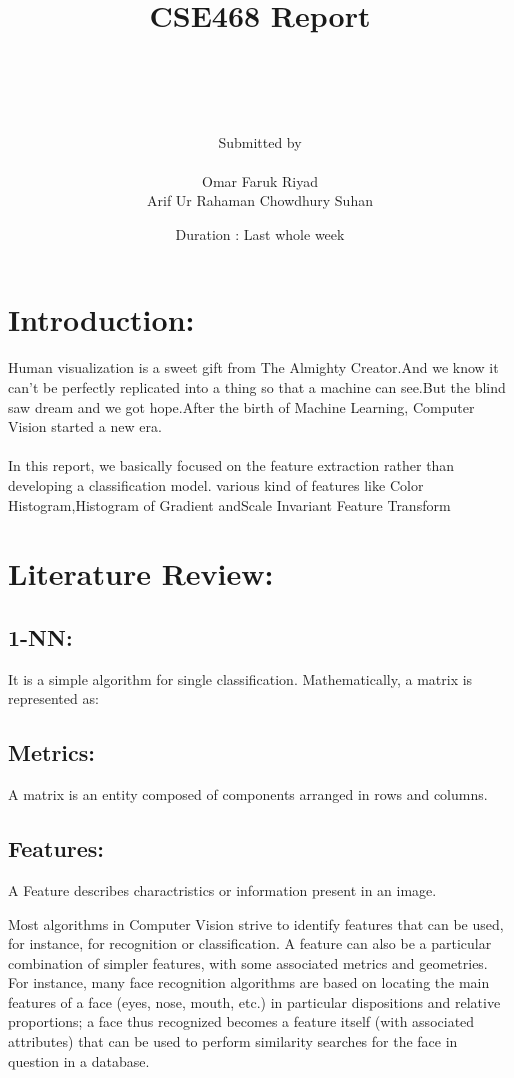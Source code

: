 \documentclass[12pt,a4paper] {article}
\author
	{	
		\\ \\ \\ \\ 
		Submitted by \\ \\
		Omar Faruk Riyad \\ 
		Arif Ur Rahaman Chowdhury Suhan
	}
\title
	{
		CSE468 Report
	}
\date{
		Duration : Last whole week
	}
\begin{document}
	\maketitle
	\pagebreak


	\section{Introduction:}
	Human visualization is a sweet gift from The Almighty Creator.And we know it can't be perfectly replicated 
	into a thing so that a machine can see.But the blind saw dream and we got hope.After the birth of Machine Learning, 
	Computer Vision started a new era.
	\\ \\
	In this report, we basically focused on the feature extraction rather than developing a classification model.
	various kind of features like Color Histogram,Histogram of Gradient andScale Invariant Feature Transform
	
	
	\section{Literature Review:}

	\subsection{1-NN:}
	It is a simple algorithm for single classification.
	Mathematically, a matrix is represented as:


	\subsection{Metrics:}
	A matrix is an entity composed of components arranged in rows and columns. 


	\subsection{Features:}
	A Feature describes charactristics or information present in an image.

	Most algorithms in Computer Vision strive to identify features that can be used, for instance, for recognition or classification. A feature can also be a particular combination of simpler features, with some associated metrics and geometries. For instance, many face recognition algorithms are based on locating the main features of a face (eyes, nose, mouth, etc.) in particular dispositions and relative proportions; a face thus recognized becomes a feature itself (with associated attributes) that can be used to perform similarity searches for the face in question in a database.
	
\end{document}
